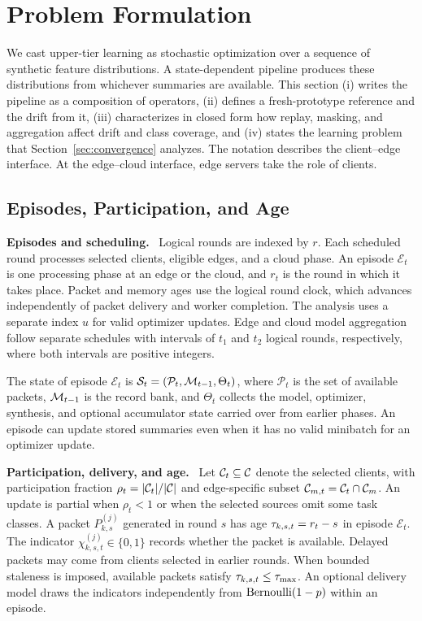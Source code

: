 \section{Problem Formulation}
\label{sec:formulation}

We cast upper-tier learning as stochastic optimization over a sequence of synthetic feature distributions. A state-dependent pipeline produces these distributions from whichever summaries are available. This section (i) writes the pipeline as a composition of operators, (ii) defines a fresh-prototype reference and the drift from it, (iii) characterizes in closed form how replay, masking, and aggregation affect drift and class coverage, and (iv) states the learning problem that Section~\ref{sec:convergence} analyzes. The notation describes the client--edge interface. At the edge--cloud interface, edge servers take the role of clients.

\subsection{Episodes, Participation, and Age}

\noindent\textbf{Episodes and scheduling.}~
Logical rounds are indexed by $r$. Each scheduled round processes selected clients, eligible edges, and a cloud phase. An episode $\mathcal E_t$ is one processing phase at an edge or the cloud, and $r_t$ is the round in which it takes place. Packet and memory ages use the logical round clock, which advances independently of packet delivery and worker completion. The analysis uses a separate index $u$ for valid optimizer updates. Edge and cloud model aggregation follow separate schedules with intervals of $t_1$ and $t_2$ logical rounds, respectively, where both intervals are positive integers.

The state of episode $\mathcal E_t$ is $\mathcal S_t=(\mathcal P_t,\mathcal{M}_{t-1},\Theta_t)$, where $\mathcal P_t$ is the set of available packets, $\mathcal{M}_{t-1}$ is the record bank, and $\Theta_t$ collects the model, optimizer, synthesis, and optional accumulator state carried over from earlier phases. An episode can update stored summaries even when it has no valid minibatch for an optimizer update.

\noindent\textbf{Participation, delivery, and age.}~
Let $\mathcal{C}_t\subseteq\mathcal{C}$ denote the selected clients, with participation fraction $\rho_t=|\mathcal{C}_t|/|\mathcal{C}|$ and edge-specific subset $\mathcal{C}_{m,t}=\mathcal{C}_t\cap\mathcal{C}_{m}$. An update is partial when $\rho_t<1$ or when the selected sources omit some task classes. A packet $P_{k,s}^{(j)}$ generated in round $s$ has age $\tau_{k,s,t}=r_t-s$ in episode $\mathcal E_t$. The indicator $\chi_{k,s,t}^{(j)}\in\{0,1\}$ records whether the packet is available. Delayed packets may come from clients selected in earlier rounds. When bounded staleness is imposed, available packets satisfy $\tau_{k,s,t}\le\tau_{\max}$. An optional delivery model draws the indicators independently from $\mathrm{Bernoulli}(1-p)$ within an episode.

